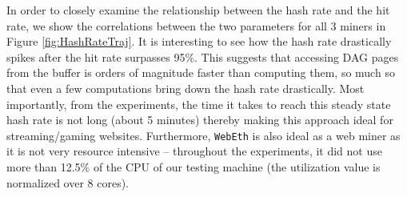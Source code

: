 \documentclass[runningheads]{llncs}
\begin{document}
\begin{figure}[t]
       \centering
\end{figure}

In order to closely examine the relationship between the hash rate and the hit rate, we show the correlations between the two parameters for all 3 miners in Figure \ref{fig:HashRateTraj}. It is interesting to see how the hash rate drastically spikes after the hit rate surpasses 95\%. This suggests that accessing DAG pages from the buffer is orders of magnitude faster than computing them, so much so that even a few computations bring down the hash rate drastically. Most importantly, from the experiments, the time it takes to reach this steady state hash rate is not long (about 5 minutes) thereby making this approach ideal for streaming/gaming websites. Furthermore, \verb|WebEth| is also ideal as a web miner as it is not very resource intensive -- throughout the experiments, it did not use more than 12.5\% of the CPU of our testing machine (the utilization value is normalized over 8 cores).
\end{document}
